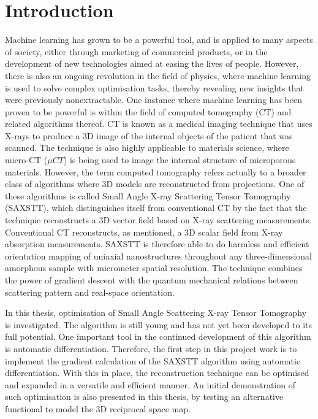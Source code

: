 \chapter{Introduction}


Machine learning has grown to be a powerful tool, and is applied to many aspects of society,
either through marketing of commercial products, or in the development of new technologies aimed at easing the lives of people.
However, there is also an ongoing revolution in the field of physics,
where machine learning is used to solve complex optimisation tasks, thereby revealing new insights that were previously nonextractable.
One instance where machine learning has been proven to be powerful is within the field of computed tomography (CT) and related algorithms thereof.
CT is known as a medical imaging technique that uses X-rays to produce a 3D image of the internal objects of the patient that was scanned.
The technique is also highly applicable to materials science, where micro-CT ($\mu CT$) is being used to image the internal structure of microporous materials.
However, the term computed tomography refers actually to a broader class of algorithms where 3D models are reconstructed from projections.
One of these algorithms is called Small Angle X-ray Scattering Tensor Tomography (SAXSTT), which distinguishes itself from conventional CT by the fact that the technique
reconstructs a 3D vector field based on X-ray scattering measurements. Conventional CT reconstructs, as mentioned, a 3D scalar field from X-ray absorption measurements.
SAXSTT is therefore able to do harmless and efficient orientation mapping of uniaxial nanostructures throughout any three-dimensional amorphous sample with micrometer spatial resolution.
The technique combines the power of gradient descent with the quantum mechanical relations between scattering pattern and real-space orientation.

In this thesis, optimisation of Small Angle Scattering X-ray Tensor Tomography is investigated.
The algorithm is still young and has not yet been developed to its full potential.
One important tool in the continued development of this algorithm is automatic differentiation.
Therefore, the first step in this project work is to implement the gradient calculation of the SAXSTT algorithm using automatic differentiation.
With this in place, the reconstruction technique can be optimised and expanded in a versatile and efficient manner.
An initial demonstration of such optimisation is also presented in this thesis, by testing an alternative functional to model the 3D reciprocal space map.